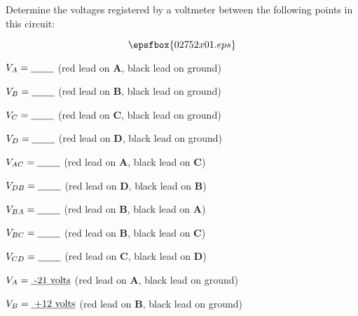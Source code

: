 

Determine the voltages registered by a voltmeter between the following points in this circuit:

$$\epsfbox{02752x01.eps}$$

$V_A = \hbox{\underbar{ \hskip 20pt}}$ (red lead on {\bf A}, black lead on ground)

\vskip 5pt

$V_B = \hbox{\underbar{ \hskip 20pt}}$ (red lead on {\bf B}, black lead on ground)

\vskip 5pt

$V_C = \hbox{\underbar{ \hskip 20pt}}$ (red lead on {\bf C}, black lead on ground)

\vskip 5pt

$V_D = \hbox{\underbar{ \hskip 20pt}}$ (red lead on {\bf D}, black lead on ground)

\vskip 20pt

$V_{AC} = \hbox{\underbar{ \hskip 20pt}}$ (red lead on {\bf A}, black lead on {\bf C})

\vskip 5pt

$V_{DB} = \hbox{\underbar{ \hskip 20pt}}$ (red lead on {\bf D}, black lead on {\bf B})

\vskip 5pt

$V_{BA} = \hbox{\underbar{ \hskip 20pt}}$ (red lead on {\bf B}, black lead on {\bf A})

\vskip 5pt

$V_{BC} = \hbox{\underbar{ \hskip 20pt}}$ (red lead on {\bf B}, black lead on {\bf C})

\vskip 5pt

$V_{CD} = \hbox{\underbar{ \hskip 20pt}}$ (red lead on {\bf C}, black lead on {\bf D})

\vskip 5pt







$V_A = \hbox{\underbar{ -21 volts}}$ (red lead on {\bf A}, black lead on ground)

\vskip 5pt

$V_B = \hbox{\underbar{ +12 volts}}$ (red lead on {\bf B}, black lead on ground)

\vskip 5pt

